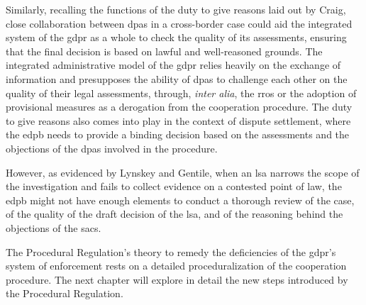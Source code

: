 Similarly, recalling the functions of the duty to give reasons laid out by Craig,\autocite[369--370]{craigProcess2018} close collaboration between \glspl{dpa} in a cross-border case could aid the integrated system of the \gls{gdpr} as a whole to check the quality of its assessments, ensuring that the final decision is based on lawful and well-reasoned grounds.
The integrated administrative model of the \gls{gdpr} relies heavily on the exchange of information and presupposes the ability of \glspl{dpa} to challenge each other on the quality of their legal assessments, through, \emph{inter alia}, the \glspl{rro} or the adoption of provisional measures as a derogation from the cooperation procedure.
The duty to give reasons also comes into play in the context of dispute settlement, where the \gls{edpb} needs to provide a binding decision based on the assessments and the objections of the \glspl{dpa} involved in the procedure.

However, as evidenced by Lynskey and Gentile, when an \gls{lsa} narrows the scope of the investigation and fails to collect evidence on a contested point of law, the \gls{edpb} might not have enough elements to conduct a thorough review of the case, of the quality of the draft decision of the \gls{lsa}, and of the reasoning behind the objections of the \glspl{sac}.\autocite[810]{gentileDeficientDesign2022}

The Procedural Regulation's theory to remedy the deficiencies of the \gls{gdpr}'s system of enforcement rests on a detailed proceduralization of the cooperation procedure. 
The next chapter will explore in detail the new steps introduced by the Procedural Regulation.